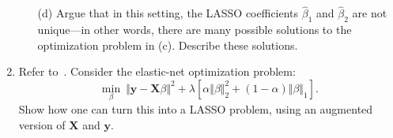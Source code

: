 \documentclass[10pt]{article}
\begin{document}
\begin{enumerate}[1.]
\begin{itemize}
        	\item[(d)] Argue that in this setting, the LASSO coefficients $\hat{\beta}_{1}$ and $\hat{\beta}_{2}$ are not unique—in other words, there are many possible solutions to the optimization problem in (c). Describe these solutions.~
        \end{itemize}
    
		\item Refer to~\cite[Ex. 3.30]{hastie2009elements}. Consider the elastic-net optimization problem:
		\begin{equation}
			\min_{\beta}~\Vert\bm{y}-\bm{X}\beta\Vert^{2} + \lambda\left[ \alpha\Vert\beta\Vert_{2}^{2} + (1-\alpha)\Vert\beta\Vert_{1}\right]. 
		\end{equation}
		Show how one can turn this into a LASSO problem, using an augmented
version of $\bm{X}$ and $\bm{y}$.~ 
\end{enumerate}
% 
% 
% 
% 
% 



\end{document}

